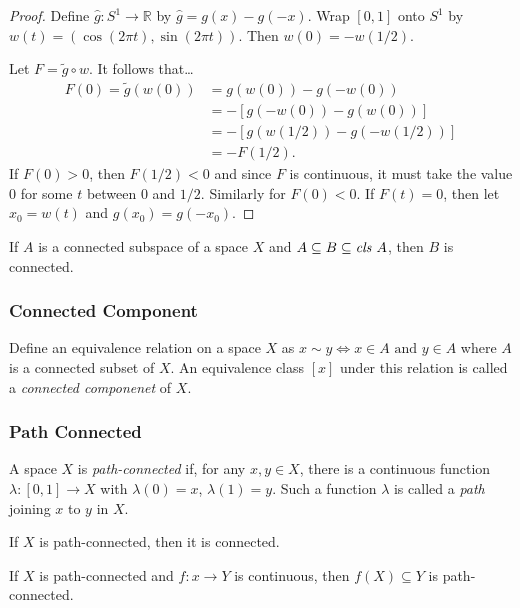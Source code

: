 \begin{proof}
Define $\hat{g} : S^1 \rightarrow \mathbb{R}$ by $\hat{g} = g(x) - g(-x)$. Wrap $[0,1]$ onto $S^1$ by $w(t) = (\cos (2 \pi t), \sin (2 \pi t)).$ Then
$w(0) = -w(1/2).$

Let $F = \tilde g \circ w$. It follows that\dots
\begin{align*}
F(0) = \tilde g(w(0)) &= g(w(0)) - g(-w(0))\\
					  &= -[g(-w(0)) - g(w(0))]\\
					  &= -[g(w(1/2)) - g(-w(1/2))]\\
					  &=-F(1/2).
\end{align*}
If $F(0) > 0$, then $F(1/2) < 0$ and since $F$ is continuous, it must take the value $0$ for some $t$ between $0$ and $1/2$. Similarly for $F(0) < 0$.
If $F(t) = 0$, then let $x_0 = w(t)$ and $g(x_0) = g(-x_0)$.
\end{proof}

\begin{proposition}
If $A$ is a connected subspace of a space $X$ and $A \subseteq B \subseteq \emph{cls } A$, then $B$ is connected.
\end{proposition}

\subsubsection{Connected Component}\label{connectedcomponent}
Define an equivalence relation on a space $X$ as $x \sim y \Leftrightarrow x \in A \textrm{ and } y \in A$ where $A$ is a connected subset of $X$.
An equivalence class $[x]$ under this relation is called a \emph{connected componenet} of $X$.

\subsubsection{Path Connected}\label{pathconnected}
A space $X$ is \emph{path-connected} if, for any $x,y \in X$, there is a continuous function $\lambda: [0,1] \rightarrow X$ with $\lambda(0) = x$, $\lambda(1) = y$.
Such a function $\lambda$ is called a \emph{path}\label{path} joining $x$ to $y$ in $X$.

\begin{proposition}
If $X$ is path-connected, then it is connected.
\end{proposition}

\begin{theorem}
If $X$ is path-connected and $f : x \rightarrow Y$ is continuous, then $f(X) \subseteq Y$ is path-connected.
\end{theorem}

